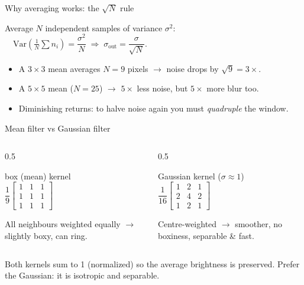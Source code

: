 \documentclass[10pt,aspectratio=169]{beamer}
\begin{document}
\begin{frame}{Why averaging works: the $\sqrt{N}$ rule}
  \begin{mathbox}
    Average $N$ independent samples of variance $\sigma^2$:
    $\quad\mathrm{Var}\!\left(\tfrac1N\sum n_i\right)=\dfrac{\sigma^2}{N}
    \;\Rightarrow\; \sigma_{\text{out}}=\dfrac{\sigma}{\sqrt{N}}.$
  \end{mathbox}
  \begin{itemize}
    \item A $3\times3$ mean averages $N=9$ pixels $\rightarrow$ noise drops by $\sqrt{9}=3\times$.
    \item A $5\times5$ mean ($N=25$) $\rightarrow$ $5\times$ less noise, but $5\times$ more blur too.
    \item Diminishing returns: to halve noise again you must \emph{quadruple} the window.
  \end{itemize}
\end{frame}

\begin{frame}{Mean filter vs Gaussian filter}
  \begin{columns}[T]
    \begin{column}{0.5\textwidth}
    \begin{center}{\scriptsize box (mean) kernel}\\[2pt]
      $\dfrac{1}{9}\begin{bmatrix}1&1&1\\1&1&1\\1&1&1\end{bmatrix}$
    \end{center}
    All neighbours weighted equally $\rightarrow$ slightly boxy, can ring.
    \end{column}
    \begin{column}{0.5\textwidth}
    \begin{center}{\scriptsize Gaussian kernel ($\sigma\!\approx\!1$)}\\[2pt]
      $\dfrac{1}{16}\begin{bmatrix}1&2&1\\2&4&2\\1&2&1\end{bmatrix}$
    \end{center}
    Centre-weighted $\rightarrow$ smoother, no boxiness, separable \& fast.
    \end{column}
  \end{columns}
  \vspace{4pt}
  \begin{goodbox}
    Both kernels sum to 1 (normalized) so the average brightness is preserved. Prefer the Gaussian: it is isotropic and separable.
  \end{goodbox}
\end{frame}
\end{document}
